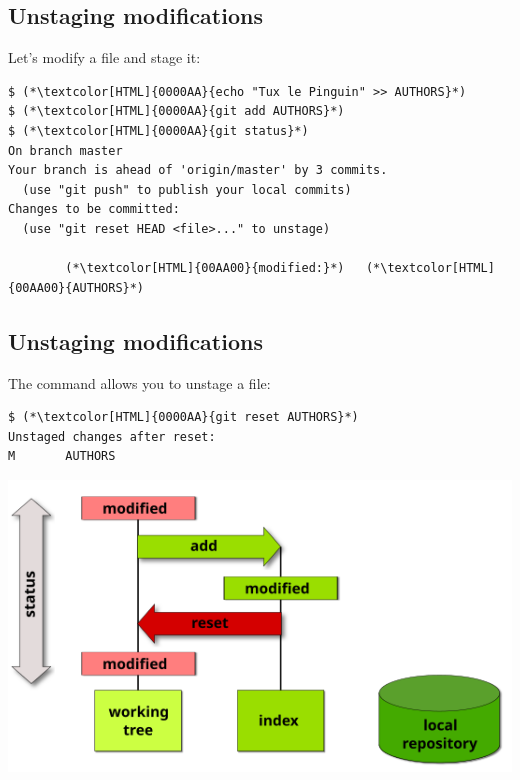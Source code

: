 \subsection{Unstaging modifications}
\begin{frame}[fragile]
\subslidetitle

  Let's modify a file and stage it:

\begin{lstlisting}
$ (*\textcolor[HTML]{0000AA}{echo "Tux le Pinguin" >> AUTHORS}*)
$ (*\textcolor[HTML]{0000AA}{git add AUTHORS}*)
$ (*\textcolor[HTML]{0000AA}{git status}*)
On branch master
Your branch is ahead of 'origin/master' by 3 commits.
  (use "git push" to publish your local commits)
Changes to be committed:
  (use "git reset HEAD <file>..." to unstage)

        (*\textcolor[HTML]{00AA00}{modified:}*)   (*\textcolor[HTML]{00AA00}{AUTHORS}*)
\end{lstlisting}

\end{frame}

\subsection{Unstaging modifications}
\begin{frame}[fragile]
\subslidetitle

  The command  allows you to unstage a file:

  \begin{lstlisting}
$ (*\textcolor[HTML]{0000AA}{git reset AUTHORS}*)
Unstaged changes after reset:
M       AUTHORS
\end{lstlisting}

  \vspace{1em}
  \centerline{\includegraphics{assets/diagrams/undo-staged}}
\end{frame}


